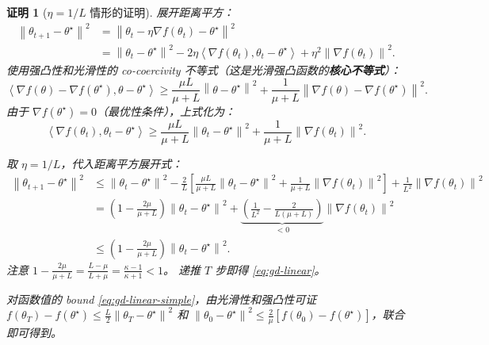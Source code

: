 \documentclass[12pt,a4paper]{ctexart}
\theoremstyle{definition}
\theoremstyle{plain}
\newtheorem*{proof*}{证明}
\newcommand{\grad}{\nabla}
\newcommand{\norm}[1]{\left\lVert #1 \right\rVert}
\newcommand{\ip}[2]{\left\langle #1,#2 \right\rangle}
\begin{document}
\begin{proof*}[$\eta = 1/L$ 情形的证明]
  展开距离平方：
  \begin{equation}
    \begin{aligned}
      \norm{\theta_{t+1} - \theta^\star}^2
      &= \norm{\theta_t - \eta \grad f(\theta_t) - \theta^\star}^2 \\
      &= \norm{\theta_t - \theta^\star}^2
        - 2\eta \ip{\grad f(\theta_t)}{\theta_t - \theta^\star}
        + \eta^2 \norm{\grad f(\theta_t)}^2.
    \end{aligned}
  \end{equation}
  使用强凸性和光滑性的 co-coercivity 不等式（这是光滑强凸函数的\textbf{核心不等式}）：
  \begin{equation}\label{eq:cocoercivity}
    \ip{\grad f(\theta) - \grad f(\theta^\star)}{\theta - \theta^\star}
    \ge \frac{\mu L}{\mu + L} \norm{\theta - \theta^\star}^2
      + \frac{1}{\mu + L} \norm{\grad f(\theta) - \grad f(\theta^\star)}^2.
  \end{equation}
  由于 $\grad f(\theta^\star) = 0$（最优性条件），上式化为：
  \begin{equation}
    \ip{\grad f(\theta_t)}{\theta_t - \theta^\star}
    \ge \frac{\mu L}{\mu + L} \norm{\theta_t - \theta^\star}^2
      + \frac{1}{\mu + L} \norm{\grad f(\theta_t)}^2.
  \end{equation}

  取 $\eta = 1/L$，代入距离平方展开式：
  \begin{equation}
    \begin{aligned}
      \norm{\theta_{t+1} - \theta^\star}^2
      &\le \norm{\theta_t - \theta^\star}^2
        - \frac{2}{L} \left[\frac{\mu L}{\mu + L} \norm{\theta_t - \theta^\star}^2
          + \frac{1}{\mu + L} \norm{\grad f(\theta_t)}^2\right]
        + \frac{1}{L^2} \norm{\grad f(\theta_t)}^2 \\[4pt]
      &= \left(1 - \frac{2\mu}{\mu + L}\right) \norm{\theta_t - \theta^\star}^2
        + \underbrace{\left(\frac{1}{L^2} - \frac{2}{L(\mu + L)}\right)}_{< 0} \norm{\grad f(\theta_t)}^2 \\[4pt]
      &\le \left(1 - \frac{2\mu}{\mu + L}\right) \norm{\theta_t - \theta^\star}^2.
    \end{aligned}
  \end{equation}
  注意 $1 - \frac{2\mu}{\mu + L} = \frac{L - \mu}{L + \mu} = \frac{\kappa - 1}{\kappa + 1} < 1$。
  递推 $T$ 步即得 \eqref{eq:gd-linear}。

  对函数值的 bound \eqref{eq:gd-linear-simple}，由光滑性和强凸性可证
  $f(\theta_T) - f(\theta^\star) \le \frac{L}{2}\norm{\theta_T - \theta^\star}^2$
  和 $\norm{\theta_0 - \theta^\star}^2 \le \frac{2}{\mu}[f(\theta_0) - f(\theta^\star)]$，联合即可得到。
\end{proof*}
\end{document}
